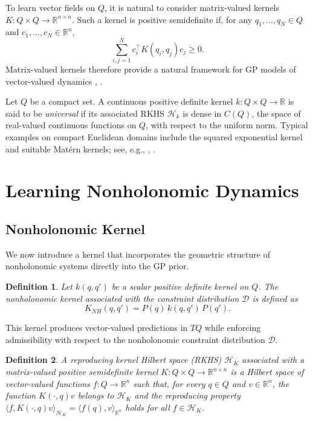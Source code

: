\documentclass[letterpaper, 10 pt, conference]{ieeeconf}
\newtheorem{definition}{Definition}
\newcommand{\D}{\mathcal{D}}
\begin{document}
To learn vector fields on $Q$, it is natural to consider matrix-valued kernels $K\colon Q\times Q\to\mathbb{R}^{n\times n}$. Such a kernel is positive semidefinite if, for any $q_1,\dots,q_N\in Q$ and $c_1,\dots,c_N\in\mathbb{R}^n$,
$$\sum_{i,j=1}^N c_i^\top K(q_i,q_j)c_j \ge 0.$$ Matrix-valued kernels therefore provide a natural framework for GP models of vector-valued dynamics \cite{micchelli2005learning}, \cite{carmeli2010vector}.

Let $Q$ be a compact set. A continuous positive definite kernel $k:Q\times Q\to\mathbb{R}$ is said to be \textit{universal} if its associated RKHS $\mathcal H_k$ is dense in $C(Q)$, the space of real-valued continuous functions on $Q$, with respect to the uniform norm.  Typical examples on compact Euclidean domains include the squared exponential kernel and suitable Mat\'ern kernels; see, e.g., \cite{steinwart2008support}, \cite{sriperumbudur2011universality}.

\section{Learning Nonholonomic Dynamics}\label{sec:nhkernel}

\subsection{Nonholonomic Kernel} 

We now introduce a kernel that incorporates the geometric structure of nonholonomic systems directly into the GP prior.

\begin{definition}
Let $k(q,q')$ be a scalar positive definite kernel on $Q$. The \emph{nonholonomic kernel} associated with the constraint distribution $\D$ is defined as
\begin{equation}
K_{NH}(q,q') = P(q)\, k(q,q')\, P(q').\label{NHK}
\end{equation}
\end{definition}



This kernel produces vector-valued predictions in $TQ$ while enforcing admissibility with respect to the nonholonomic constraint distribution $\mathcal D$.


\begin{definition}A reproducing kernel Hilbert space (RKHS) $\mathcal{H}_K$ associated with a matrix-valued positive semidefinite kernel $K: Q\times Q \to \mathbb{R}^{n\times n}$ is a Hilbert space of vector-valued functions $f:Q\to\mathbb{R}^n$ such that, for every $q\in Q$ and $v\in\mathbb{R}^n$, the function $K(\cdot,q)v$ belongs to $\mathcal{H}_K$ and the reproducing property $\langle f, K(\cdot,q)v\rangle_{\mathcal{H}_K}= \langle f(q), v\rangle_{\mathbb{R}^n}$ holds for all $f\in\mathcal{H}_K$.\end{definition}
\end{document}
